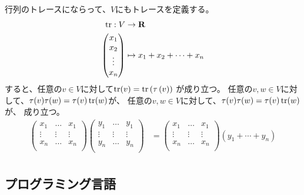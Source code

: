 行列のトレースにならって、$V$にもトレースを定義する。
\begin{equation}\begin{split}
	\operatorname{tr}: V &\to {\mathbf{R}} \\
		\begin{pmatrix}
			x_1 \\ 
			x_2 \\ 
			\vdots \\ 
			x_n \\
		\end{pmatrix} &\mapsto x_1+x_2+\cdots+x_n \\
\end{split}\end{equation}
すると、任意の$v\in V$に対して$\operatorname{tr}(v)=\operatorname{tr}\left({\tau\left({v}\right)}\right)$
が成り立つ。
任意の$v,w\in V$に対して、$\tau(v)\tau(w)=\tau(v)\operatorname{tr}(w)$が、
任意の$v,w\in V$に対して、$\tau(v)\tau(w)=\tau(v)\operatorname{tr}(w)$が、
成り立つ。
\begin{equation}\begin{split}
		\begin{pmatrix}
			x_1 & \dots & x_1 \\ 
			\vdots & \vdots & \vdots \\ 
			x_n & \dots & x_n \\ 
		\end{pmatrix} \begin{pmatrix}
			y_1 & \dots & y_1 \\ 
			\vdots & \vdots & \vdots \\ 
			y_n & \dots & y_n \\ 
		\end{pmatrix} &= \begin{pmatrix}
			x_1 & \dots & x_1 \\ 
			\vdots & \vdots & \vdots \\ 
			x_n & \dots & x_n \\ 
		\end{pmatrix}(y_1+\cdots+y_n) \\
\end{split}\end{equation}

\subsection{プログラミング言語}
